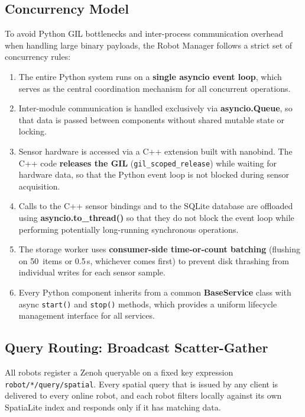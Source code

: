 \subsection{Concurrency Model} \label{subsec:concurrency-model}

To avoid Python GIL bottlenecks and inter-process communication overhead when handling large binary payloads, the Robot Manager follows a strict set of concurrency rules:

\begin{enumerate}
    \item The entire Python system runs on a \textbf{single asyncio event loop}, which serves as the central coordination mechanism for all concurrent operations.
    \item Inter-module communication is handled exclusively via \textbf{asyncio.Queue}, so that data is passed between components without shared mutable state or locking.
    \item Sensor hardware is accessed via a C++ extension built with nanobind. The C++ code \textbf{releases the GIL} (\texttt{gil\_scoped\_release}) while waiting for hardware data, so that the Python event loop is not blocked during sensor acquisition.
    \item Calls to the C++ sensor bindings and to the SQLite database are offloaded using \textbf{asyncio.to\_thread()} so that they do not block the event loop while performing potentially long-running synchronous operations.
    \item The storage worker uses \textbf{consumer-side time-or-count batching} (flushing on 50~items or 0.5\,s, whichever comes first) to prevent disk thrashing from individual writes for each sensor sample.
    \item Every Python component inherits from a common \textbf{BaseService} class with async \texttt{start()} and \texttt{stop()} methods, which provides a uniform lifecycle management interface for all services.
\end{enumerate}


\subsection{Query Routing: Broadcast Scatter-Gather} \label{subsec:query-routing}

All robots register a Zenoh queryable on a fixed key expression \texttt{robot/*/query/spatial}. Every spatial query that is issued by any client is delivered to every online robot, and each robot filters locally against its own SpatiaLite index and responds only if it has matching data.

